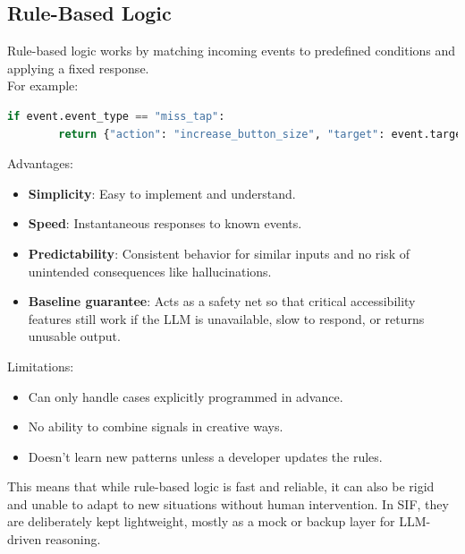 \documentclass[openany]{book}
\begin{document}
\subsection{Rule-Based Logic}
Rule-based logic works by matching incoming events to predefined conditions and applying a fixed response.\\
For example:
\begin{lstlisting}[language=python, breaklines]
    if event.event_type == "miss_tap":
        return {"action": "increase_button_size", "target": event.target_element, "value": 1.5}
\end{lstlisting}
Advantages:
\begin{itemize}
    \item \textbf{Simplicity}: Easy to implement and understand.
    \item \textbf{Speed}: Instantaneous responses to known events.
    \item \textbf{Predictability}: Consistent behavior for similar inputs and no risk of unintended consequences like hallucinations.
    \item \textbf{Baseline guarantee}: Acts as a safety net so that critical accessibility features still work if the LLM is unavailable, slow to respond, or returns unusable output.
\end{itemize}
Limitations:
\begin{itemize}
    \item Can only handle cases explicitly programmed in advance.
    \item No ability to combine signals in creative ways.
    \item Doesn’t learn new patterns unless a developer updates the rules.
\end{itemize}
This means that while rule-based logic is fast and reliable, it can also be rigid and unable to adapt to new situations without human intervention. In SIF, they are deliberately kept lightweight, mostly as a mock or backup layer for LLM-driven reasoning.
\end{document}
